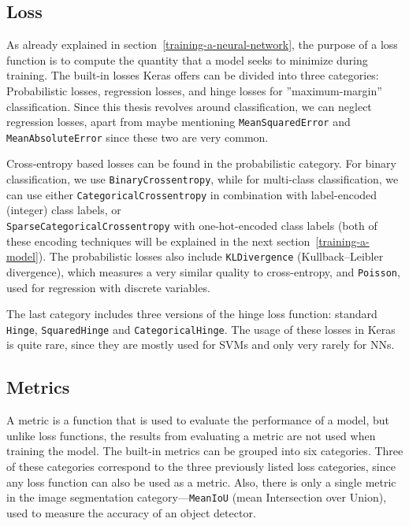 \subsection*{Loss}
\label{loss}
As already explained in section~\ref{training-a-neural-network},
the purpose of a loss function is to compute the quantity that a model seeks to minimize during training.
The built-in losses Keras offers can be divided into three categories: Probabilistic losses, regression losses, and
hinge losses for ''maximum-margin'' classification. Since this thesis revolves around classification,
we can neglect regression losses, apart from maybe mentioning \texttt{MeanSquaredError} and
\texttt{MeanAbsoluteError} since these two are very common.

Cross-entropy based losses can be found in the probabilistic category.
For binary classification, we use \texttt{BinaryCrossentropy}, while for multi-class
classification, we can use either \texttt{CategoricalCrossentropy} in combination with
label-encoded (integer) class labels, or\\ \texttt{SparseCategoricalCrossentropy} with one-hot-encoded
class labels (both of these encoding techniques will be explained in the next section~\ref{training-a-model}).
The probabilistic losses also include \texttt{KLDivergence} (Kullback–Leibler divergence), which measures
a very similar quality to cross-entropy, and \texttt{Poisson}, used for regression with discrete variables.

The last category includes three versions of the hinge loss function: standard \texttt{Hinge},
\texttt{SquaredHinge} and \texttt{CategoricalHinge}. The usage of these losses in Keras is quite rare,
since they are mostly used for SVMs and only very rarely for NNs.


\subsection*{Metrics}
\label{metrics}
A metric is a function that is used to evaluate the performance of a model,
but unlike loss functions, the results from evaluating a metric are not used when training the model.
The built-in metrics can be grouped into six categories. Three of these
categories correspond to the three previously listed loss categories, since any loss function can also
be used as a metric. Also, there is only a single metric in the image segmentation category---\texttt{MeanIoU}
(mean Intersection over Union), used to measure the accuracy of an object detector.

